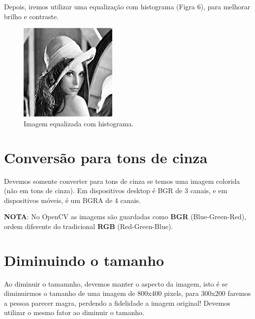 \documentclass[12pt]{article}
\begin{document}
	Depois, iremos utilizar uma equalização com histograma (Figra 6), para melhorar brilho e contraste.
				\begin{figure}[ht!]
		\centering
		\includegraphics[width=\textwidth]{equalized}
		\caption{Imagem equalizada com histograma.}
	\end{figure}
	
	\section{Conversão para tons de cinza}
	
	Devemos somente converter para tons de cinza se temos uma imagem colorida (não em tons de cinza). Em dispositivos desktop é BGR de 3 canais, e em dispositivos móveis, é um BGRA de 4 canais. 
	
	\textbf{NOTA}: No OpenCV as imagems são guardadas como \textbf{BGR} (Blue-Green-Red), ordem diferente do tradicional \textbf{RGB} (Red-Green-Blue).
	
	\section{Diminuindo o tamanho}
	
	Ao diminuir o tamamnho, devemos manter o aspecto da imagem, isto é se diminuirmos o tamanho de uma imagem de 800x400 pixels, para
	300x200 faremos a pessoa parecer magra, perdendo a fidelidade a imagem original!
	Devemos utilizar o mesmo fator ao diminuir o tamanho.
	
\end{document}
